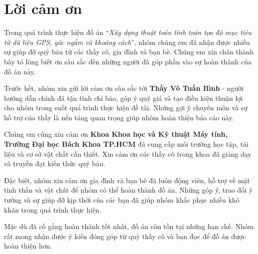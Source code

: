 \section*{Lời cảm ơn}
\thispagestyle{empty}


Trong quá trình thực hiện đồ án “\textit{Xây dựng thuật toán tính toán tọa độ mục tiêu từ dữ liệu GPS, góc ngắm và khoảng cách}”, nhóm chúng em đã nhận được nhiều sự giúp đỡ quý báu từ các thầy cô, gia đình và bạn bè. Chúng em xin chân thành bày tỏ lòng biết ơn sâu sắc đến những người đã góp phần vào sự hoàn thành của đồ án này.

Trước hết, nhóm xin gửi lời cảm ơn sâu sắc tới \textbf{Thầy Võ Tuấn Bình} - người hướng dẫn chính đã tận tình chỉ bảo, góp ý quý giá và tạo điều kiện thuận lợi cho nhóm trong suốt quá trình thực hiện đề tài. Những gợi ý chuyên môn và sự hỗ trợ của thầy là nền tảng quan trọng giúp nhóm hoàn thiện báo cáo này.

Chúng em cũng xin cảm ơn \textbf{Khoa Khoa học và Kỹ thuật Máy tính, Trường Đại học Bách Khoa TP.HCM} đã cung cấp môi trường học tập, tài liệu và cơ sở vật chất cần thiết. Xin cảm ơn các thầy cô trong khoa đã giảng dạy và truyền đạt kiến thức quý báu.

Đặc biệt, nhóm xin cảm ơn gia đình và bạn bè đã luôn động viên, hỗ trợ về mặt tinh thần và vật chất để nhóm có thể hoàn thành đồ án. Những góp ý, trao đổi ý tưởng và sự giúp đỡ kịp thời của các bạn đã giúp nhóm khắc phục nhiều khó khăn trong quá trình thực hiện.

Mặc dù đã cố gắng hoàn thành tốt nhất, đồ án còn tồn tại những hạn chế. Nhóm rất mong nhận được ý kiến đóng góp từ quý thầy cô và bạn đọc để đồ án được hoàn thiện hơn.


\clearpage
{}
